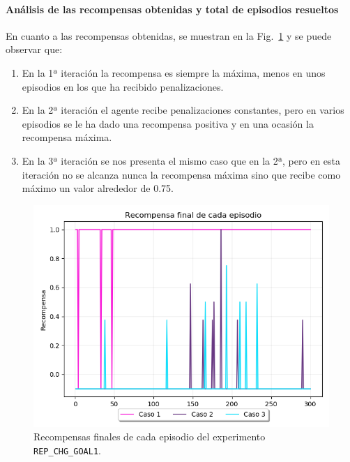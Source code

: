 \paragraph{Análisis de las recompensas obtenidas y total de episodios resueltos} 

En cuanto a las recompensas obtenidas, se muestran en la Fig.~\ref{fig:CHANGE_GOAL-20_09-21_30-0, 2, 1_recompensa} y se puede observar que: 
\begin{enumerate}
    \item En la 1ª iteración la recompensa es siempre la máxima, menos en unos episodios en los que ha recibido penalizaciones.  
    \item En la 2ª iteración el agente recibe penalizaciones constantes, pero en varios episodios se le ha dado una recompensa positiva y en una ocasión la recompensa máxima.
    \item En la 3ª iteración se nos presenta el mismo caso que en la 2ª, pero en esta iteración no se alcanza nunca la recompensa máxima sino que recibe como máximo un valor alrededor de 0.75. 
\end{enumerate}

\begin{figure}
    \centering
    \includegraphics[scale=0.4]{cap5_experimentacion/images/CHANGE_GOAL-20_09-21_30-0, 2, 1_recompensa.png}
    \caption{Recompensas finales de cada episodio del experimento \texttt{REP\_CHG\_GOAL1}.}
    \label{fig:CHANGE_GOAL-20_09-21_30-0, 2, 1_recompensa}
\end{figure}
 
